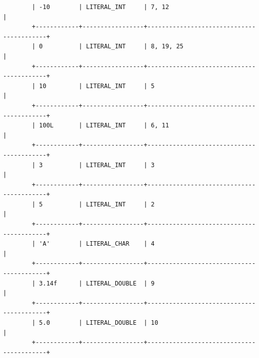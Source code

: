 \documentclass[a4paper,12pt]{article}
\begin{document}
\begin{flushleft}
\begin{verbatim}
		| -10        | LITERAL_INT     | 7, 12                                    |
		+------------+-----------------+------------------------------------------+
		| 0          | LITERAL_INT     | 8, 19, 25                                |
		+------------+-----------------+------------------------------------------+
		| 10         | LITERAL_INT     | 5                                        |
		+------------+-----------------+------------------------------------------+
		| 100L       | LITERAL_INT     | 6, 11                                    |
		+------------+-----------------+------------------------------------------+
		| 3          | LITERAL_INT     | 3                                        |
		+------------+-----------------+------------------------------------------+
		| 5          | LITERAL_INT     | 2                                        |
		+------------+-----------------+------------------------------------------+
		| 'A'        | LITERAL_CHAR    | 4                                        |
		+------------+-----------------+------------------------------------------+
		| 3.14f      | LITERAL_DOUBLE  | 9                                        |
		+------------+-----------------+------------------------------------------+
		| 5.0        | LITERAL_DOUBLE  | 10                                       |
		+------------+-----------------+------------------------------------------+
	\end{verbatim}
\end{flushleft}
\end{document}
